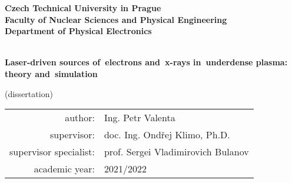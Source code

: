 \documentclass[10pt, twoside, a4paper, openright]{report}
\newcommand{\ctu}{Czech Technical University in Prague}
\newcommand{\fnspe}{Faculty of Nuclear Sciences and Physical Engineering}
\newcommand{\dpe}{Department of Physical Electronics}
\newcommand{\projecttitle}{Laser-driven sources of~electrons and~x-rays in~underdense plasma: theory and~simulation}
\newcommand{\valenta}{Ing. Petr Valenta}
\newcommand{\klimo}{doc. Ing. Ondřej Klimo, Ph.D.}
\newcommand{\bulanov}{prof. Sergei Vladimirovich Bulanov}
\newcommand{\academicyear}{2021/2022}
\begin{document}
\pagestyle{empty}


\mbox{}
\newpage

\begin{titlepage}

\begin{center}
{\Large \bf \ctu}\\[4mm]
{\Large \bf \fnspe}\\[4mm]
{\Large \bf \dpe}\\[16mm]
\epsfysize=45mm \\[12mm]
\begin{spacing}{2.0}
{\LARGE \bf \projecttitle} \\
\end{spacing}
{\Large (dissertation)} \\
\vfill
\end{center}

\begin{center}
\begin{tabular}{rl}
author: & \valenta \\[1mm]
supervisor: & \klimo \\[1mm]
supervisor specialist: & \bulanov \\[1mm]
academic year: & \academicyear \\[1mm]
\end{tabular}
\end{center}

\end{titlepage}


\newpage
\mbox{}


%


%


\end{document}

